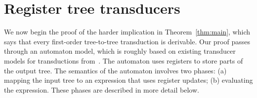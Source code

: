 


\section{Register tree transducers}
\label{sec:stt}
We now begin the proof of the harder implication in Theorem~\ref{thm:main}, which says that every first-order tree-to-tree transduction is derivable. Our proof passes  through an automaton model, which  is roughly based on existing transducer models for \mso transductions from~\cite{bloem_comparison_2000,alur2017streaming}.
The automaton  uses registers to store parts of the output tree. The semantics of the automaton involves two phases: (a) mapping the input tree to an expression that uses register updates; (b) evaluating the expression. These phases are described in more detail below.


%
%


